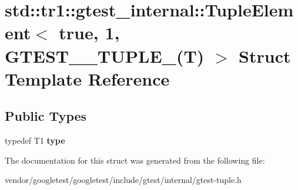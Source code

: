 \hypertarget{structstd_1_1tr1_1_1gtest__internal_1_1TupleElement_3_01true_00_011_00_01GTEST__10__TUPLE___07T_08_01_4}{}\section{std\+:\+:tr1\+:\+:gtest\+\_\+internal\+:\+:Tuple\+Element$<$ true, 1, G\+T\+E\+S\+T\+\_\+\_\+\+T\+U\+P\+L\+E\+\_\+(T) $>$ Struct Template Reference}
\label{structstd_1_1tr1_1_1gtest__internal_1_1TupleElement_3_01true_00_011_00_01GTEST__10__TUPLE___07T_08_01_4}
\subsection*{Public Types}
\begin{DoxyCompactItemize}
\item 
typedef T1 {\bfseries type}\hypertarget{structstd_1_1tr1_1_1gtest__internal_1_1TupleElement_3_01true_00_011_00_01GTEST__10__TUPLE___07T_08_01_4_a485ca13c9a68cc87072ef1592f97665e}{}\label{structstd_1_1tr1_1_1gtest__internal_1_1TupleElement_3_01true_00_011_00_01GTEST__10__TUPLE___07T_08_01_4_a485ca13c9a68cc87072ef1592f97665e}

\end{DoxyCompactItemize}


The documentation for this struct was generated from the following file\+:\begin{DoxyCompactItemize}
\item 
vendor/googletest/googletest/include/gtest/internal/gtest-\/tuple.\+h\end{DoxyCompactItemize}
